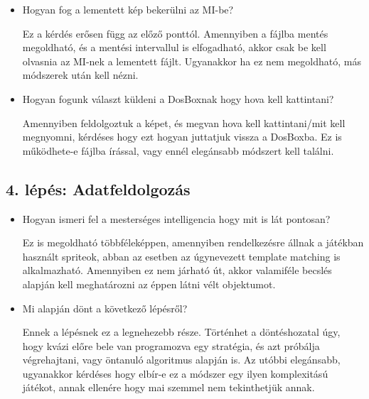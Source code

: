\begin{itemize}
    \item Hogyan fog a lementett kép bekerülni az MI-be?
    
    Ez a kérdés erősen függ az előző ponttól. Amennyiben a fájlba mentés megoldható, és a mentési intervallul is elfogadható, akkor csak be kell olvasnia az MI-nek a lementett fájlt. Ugyanakkor ha ez nem megoldható, más módszerek után kell nézni.  
    
    \item Hogyan fogunk választ küldeni a DosBoxnak hogy hova kell kattintani?
    
    Amennyiben feldolgoztuk a képet, és megvan hova kell kattintani/mit kell megnyomni, kérdéses hogy ezt hogyan juttatjuk vissza a DosBoxba. Ez is működhete-e fájlba írással, vagy ennél elegánsabb módszert kell találni.  

\end{itemize}


\subsection{4. lépés: Adatfeldolgozás}

\begin{itemize}
    \item Hogyan ismeri fel a mesterséges intelligencia hogy mit is lát pontosan?
    
    Ez is megoldható többféleképpen, amennyiben rendelkezésre állnak a játékban használt spriteok, abban az esetben az úgynevezett template matching is alkalmazható. Amennyiben ez nem járható út, akkor valamiféle becslés alapján kell meghatározni az éppen látni vélt objektumot.

    \item Mi alapján dönt a következő lépésről?
    
    Ennek a lépésnek ez a legnehezebb része. Történhet a döntéshozatal úgy, hogy kvázi előre bele van programozva egy stratégia, és azt próbálja végrehajtani, vagy öntanuló algoritmus alapján is. Az utóbbi elegánsabb, ugyanakkor kérdéses hogy elbír-e ez a módszer egy ilyen komplexitású játékot, annak ellenére hogy mai szemmel nem tekinthetjük annak. 
\end{itemize}



